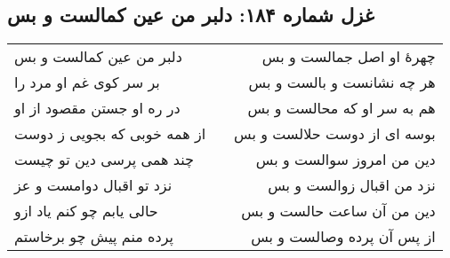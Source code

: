 \begin{center}
\section*{غزل شماره ۱۸۴: دلبر من عین کمالست و بس}
\label{sec:184}
\begin{longtable}{l p{0.5cm} r}
دلبر من عین کمالست و بس
&&
چهرهٔ او اصل جمالست و بس
\\
بر سر کوی غم او مرد را
&&
هر چه نشانست و بالست و بس
\\
در ره او جستن مقصود از او
&&
هم به سر او که محالست و بس
\\
از همه خوبی که بجویی ز دوست
&&
بوسه ای از دوست حلالست و بس
\\
چند همی پرسی دین تو چیست
&&
دین من امروز سوالست و بس
\\
نزد تو اقبال دوامست و عز
&&
نزد من اقبال زوالست و بس
\\
حالی یابم چو کنم یاد ازو
&&
دین من آن ساعت حالست و بس
\\
پرده منم پیش چو برخاستم
&&
از پس آن پرده وصالست و بس
\\
\end{longtable}
\end{center}
